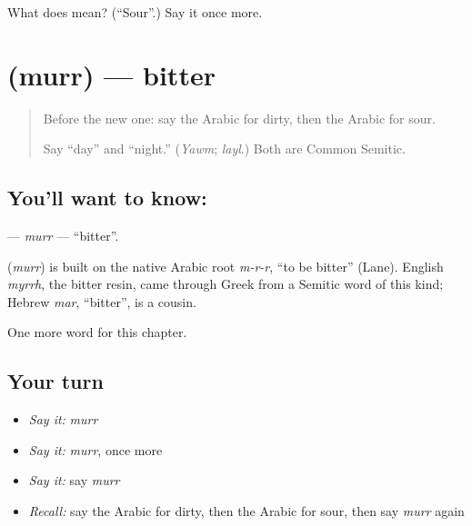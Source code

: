 \begin{tcolorbox}[breakable,colback=teal!4,colframe=teal!35!black,title={Before you move on}]
What does  mean? (\textquotedblleft{}Sour\textquotedblright{}.) Say it once more.
\end{tcolorbox}
\section[\texorpdfstring{\ar{مر} (murr)}{مر (murr)}]{ (murr) — bitter}

\label{lesson:AR-C152-murr}



\begin{quote}
Before the new one: say the Arabic for dirty, then the Arabic for sour.

Say \textquotedblleft{}day\textquotedblright{} and \textquotedblleft{}night.\textquotedblright{} (\emph{Yawm}; \emph{layl}.) Both are Common Semitic.
\end{quote}

\subsection*{You'll want to know: }
\textbf{} — \emph{murr} — \textquotedblleft{}bitter\textquotedblright{}.

\begin{cousinweb}
\textbf{} (\emph{murr}) is built on the native Arabic root \emph{m-r-r}, \textquotedblleft{}to be bitter\textquotedblright{} (Lane). English \emph{myrrh}, the bitter resin, came through Greek from a Semitic word of this kind; Hebrew \emph{mar}, \textquotedblleft{}bitter\textquotedblright{}, is a cousin.
\end{cousinweb}

\begin{grammarlens}[title={What you've built}]
One more word for this chapter.
\end{grammarlens}

\subsection*{Your turn}
\begin{itemize}
\raggedright
  \item \emph{Say it:} \emph{murr}
  \item \emph{Say it:} \emph{murr}, once more
  \item \emph{Say it:} say \emph{murr}
  \item \emph{Recall:} say the Arabic for dirty, then the Arabic for sour, then say \emph{murr} again
\end{itemize}

